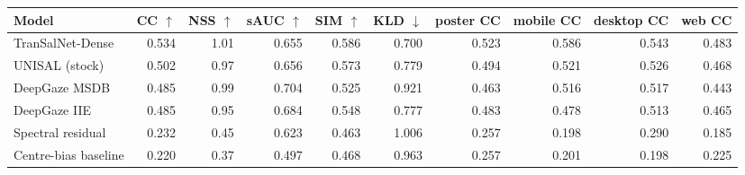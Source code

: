 \begin{tabular}{lrrrrrrrrr}
\toprule
Model & CC $\uparrow$ & NSS $\uparrow$ & sAUC $\uparrow$ & SIM $\uparrow$ & KLD $\downarrow$ & poster CC & mobile CC & desktop CC & web CC \\
\midrule
TranSalNet-Dense & 0.534 & 1.01 & 0.655 & 0.586 & 0.700 & 0.523 & 0.586 & 0.543 & 0.483 \\
UNISAL (stock) & 0.502 & 0.97 & 0.656 & 0.573 & 0.779 & 0.494 & 0.521 & 0.526 & 0.468 \\
DeepGaze MSDB & 0.485 & 0.99 & 0.704 & 0.525 & 0.921 & 0.463 & 0.516 & 0.517 & 0.443 \\
DeepGaze IIE & 0.485 & 0.95 & 0.684 & 0.548 & 0.777 & 0.483 & 0.478 & 0.513 & 0.465 \\
Spectral residual & 0.232 & 0.45 & 0.623 & 0.463 & 1.006 & 0.257 & 0.198 & 0.290 & 0.185 \\
Centre-bias baseline & 0.220 & 0.37 & 0.497 & 0.468 & 0.963 & 0.257 & 0.201 & 0.198 & 0.225 \\
\bottomrule
\end{tabular}
